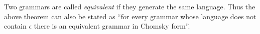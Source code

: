 

\setcounter{section}{5}
\setcounter{subsection}{2}
\setcounter{dfn}{6}


Two grammars are called \emph{equivalent} if they generate the same language.
Thus the above theorem can also be stated as
``for every grammar whose language does not contain $\epsilon$ there is an equivalent grammar in Chomsky form''.



